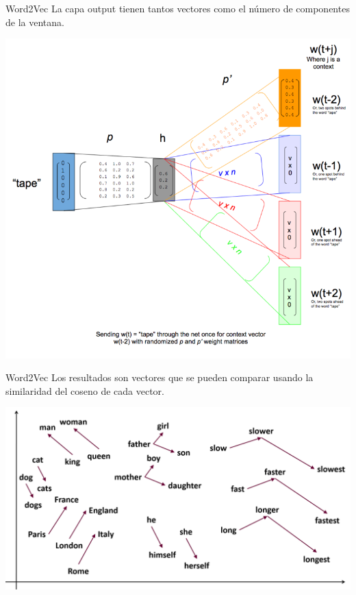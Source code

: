 \documentclass[table]{beamer}
\begin{document}
  \begin{frame}{Word2Vec}
      La capa output tienen tantos vectores como el número de componentes de la ventana.

      \centering
      \includegraphics[scale=0.50]{./figures/skip-gram-exp.png}
  \end{frame}

  \begin{frame}{Word2Vec}
      Los resultados son vectores que se pueden comparar usando la similaridad del coseno de cada vector.

      \centering
      \includegraphics[width=\textwidth]{./figures/res-w2v.png}
  \end{frame}
\end{document}
